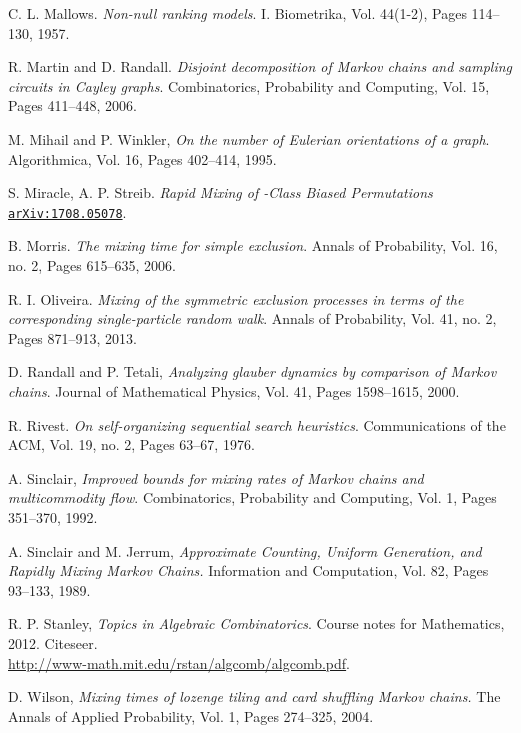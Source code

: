 \documentclass[10 pt]{article}
\newcommand{\arx}[1]{\href{http://arxiv.org/abs/#1}{\texttt{arXiv:#1}}}
\begin{document}
\begin{thebibliography}{10}
C. L. Mallows.\emph{ Non-null ranking models}. I. Biometrika, Vol. 44(1-2), Pages 114--130, 1957.

  R. Martin and D. Randall. \emph{Disjoint decomposition of Markov chains and sampling circuits in Cayley graphs}.
Combinatorics, Probability and Computing, Vol. 15, Pages 411--448, 2006.

 M. Mihail and P. Winkler, \emph{ On the number of Eulerian orientations of a graph}.  Algorithmica, Vol. 16, Pages 402--414, 1995.

 S. Miracle, A. P. Streib. \emph{Rapid Mixing of -Class Biased Permutations}
\arx{1708.05078}.

B. Morris.\emph{
The mixing time for simple exclusion}.
Annals of Probability, Vol. 16, no. 2, Pages 615--635, 2006.

R. I. Oliveira. \emph{
Mixing of the symmetric exclusion processes in terms of the corresponding single-particle random walk}. Annals of Probability,
 Vol. 41, no. 2, Pages 871--913, 2013.

  D. Randall and P. Tetali, \emph{Analyzing glauber dynamics by comparison of Markov chains}.
Journal of Mathematical Physics, Vol. 41, Pages 1598--1615, 2000.

 R. Rivest.  \emph{On self-organizing sequential search heuristics}. Communications of the ACM, Vol. 19, no. 2, Pages 63--67, 1976.

 A. Sinclair, \emph{Improved bounds for mixing rates of Markov chains and multicommodity flow}. Combinatorics, Probability and Computing, Vol. 1,  Pages 351--370, 1992.

 A. Sinclair and M. Jerrum, \emph{Approximate Counting, Uniform Generation, and Rapidly Mixing Markov Chains.} Information and Computation, Vol. 82, Pages 93--133, 1989.

  R. P. Stanley, \emph{Topics in Algebraic  Combinatorics}. Course notes for Mathematics, 2012. Citeseer.\\
\href{http://www-math.mit.edu/~rstan/algcomb/algcomb.pdf}{ http://www-math.mit.edu/rstan/algcomb/algcomb.pdf}.

 D. Wilson, \emph{Mixing times of lozenge tiling and card shuffling Markov chains.} The Annals of
Applied Probability, Vol. 1, Pages 274--325, 2004.

\end{thebibliography}
\end{document}
